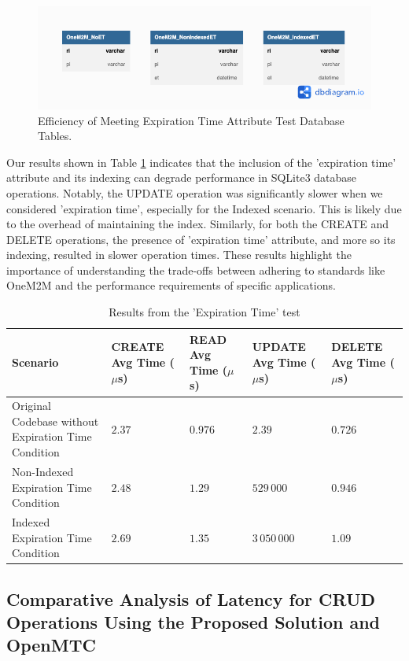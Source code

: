 \documentclass[a4paper,fleqn]{cas-dc}
\begin{document}
\begin{figure}[h]
\centering
\includegraphics[width=\linewidth]{TestExpirationTime}
\caption{Efficiency of Meeting Expiration Time Attribute Test Database Tables.}
\label{fig:tableDiagram}
\end{figure}

Our results shown in Table \ref{tab:ExpirationTime} indicates that the inclusion of the 'expiration time' attribute and its indexing can degrade performance in SQLite3 database operations. Notably, the UPDATE operation was significantly slower when we considered 'expiration time', especially for the Indexed scenario. This is likely due to the overhead of maintaining the index. Similarly, for both the CREATE and DELETE operations, the presence of 'expiration time' attribute, and more so its indexing, resulted in slower operation times. These results highlight the importance of understanding the trade-offs between adhering to standards like OneM2M and the performance requirements of specific applications.

\begin{table}[h]
\scriptsize
\centering
\caption{Results from the 'Expiration Time' test}
\label{tab:ExpirationTime}
\begin{tabular}{l p{2cm} p{2cm} p{2cm} p{2cm}}
\hline
\textbf{Scenario} & \textbf{CREATE Avg Time ($\mu$s)} & \textbf{READ Avg Time ($\mu$s)} & \textbf{UPDATE Avg Time ($\mu$s)} & \textbf{DELETE Avg Time ($\mu$s)}\\ \hline \hline
Original Codebase without Expiration Time Condition & $2.37$ & $0.976$ & $2.39$ & $0.726$\\
Non-Indexed Expiration Time Condition & $2.48$ & $1.29$ & $529\,000$ & $0.946$\\
Indexed Expiration Time Condition & $2.69$ & $1.35$ & $3\,050\,000$ & $1.09$\\ \hline
\end{tabular}
\end{table}

\subsection{Comparative Analysis of Latency for CRUD Operations Using the Proposed Solution and OpenMTC}
\end{document}
